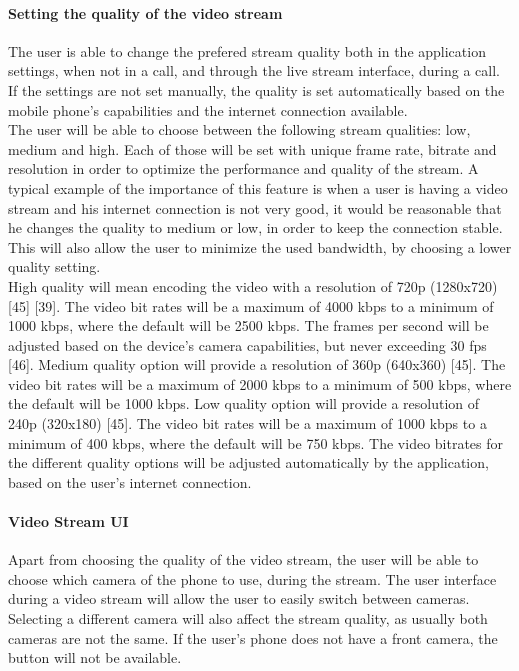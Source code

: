 \documentclass{article}
\begin{document}
			\paragraph{Setting the quality of the video stream}
			The user is able to change the prefered stream quality both in the application settings, when not in a call, and through the live stream interface, during a call. If the settings are not set manually, the quality is set automatically based on the mobile phone’s capabilities and the internet connection available.\\

The user will be able to choose between the following stream qualities: low, medium and high. Each of those will be set with unique frame rate, bitrate and resolution in order to optimize the performance and quality of the stream. A typical example of the importance of this feature is when a user is having a video stream and his internet connection is not very good, it would be reasonable that he changes the quality to medium or low, in order to keep the connection stable. This will also allow the user to minimize the used bandwidth, by choosing a lower quality setting.\\

High quality will mean encoding the video with a resolution of 720p (1280x720) [45] [39]. The video bit rates will be a maximum of 4000 kbps to a minimum of 1000 kbps, where the default will be 2500 kbps. The frames per second will be adjusted based on the device’s camera capabilities, but never exceeding 30 fps [46]. Medium quality option will provide a resolution of 360p (640x360) [45]. The video bit rates will be a maximum of 2000 kbps to a minimum of 500 kbps, where the default will be 1000 kbps. Low quality option will provide a resolution of 240p (320x180) [45]. The video bit rates will be a maximum of 1000 kbps to a minimum of 400 kbps, where the default will be 750 kbps. The video bitrates for the different quality options will be adjusted automatically by the application, based on the user’s internet connection.

\paragraph{Video Stream UI}
Apart from choosing the quality of the video stream, the user will be able to choose which camera of the phone to use, during the stream. The user interface during a video stream will allow the user to easily switch between cameras. Selecting a different camera will also affect the stream quality, as usually both cameras are not the same. If the user’s phone does not have a front camera, the button will not be available.\\
\end{document}
